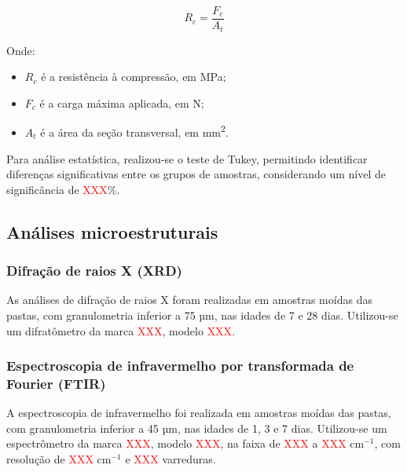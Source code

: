 \begin{equation}
    \label{eq:resistencia_compressao}
    R_c = \frac{F_c}{A_t}
\end{equation}

Onde:
\begin{itemize}
    \item $R_c$ é a resistência à compressão, em MPa;
    \item $F_c$ é a carga máxima aplicada, em N;
    \item $A_t$ é a área da seção transversal, em mm\textsuperscript{2}.
\end{itemize}

Para análise estatística, realizou-se o teste de Tukey, permitindo identificar diferenças significativas entre os grupos de amostras, considerando um nível de significância de \textcolor{red}{XXX}\%.

\subsection{Análises microestruturais}
\label{subsec:analises_microestruturais}

\subsubsection{Difração de raios X (XRD)}
\label{subsubsec:difracao_de_raios_x}

As análises de difração de raios X foram realizadas em amostras moídas das pastas, com granulometria inferior a 75 µm, nas idades de 7 e 28 dias. Utilizou-se um difratômetro da marca \textcolor{red}{XXX}, modelo \textcolor{red}{XXX}.

\subsubsection{Espectroscopia de infravermelho por transformada de Fourier (FTIR)}
\label{subsubsec:espectroscopia_de_infravermelho}

A espectroscopia de infravermelho foi realizada em amostras moídas das pastas, com granulometria inferior a 45 µm, nas idades de 1, 3 e 7 dias. Utilizou-se um espectrômetro da marca \textcolor{red}{XXX}, modelo \textcolor{red}{XXX}, na faixa de \textcolor{red}{XXX} a \textcolor{red}{XXX} cm$^{-1}$, com resolução de \textcolor{red}{XXX} cm$^{-1}$ e \textcolor{red}{XXX} varreduras. 


